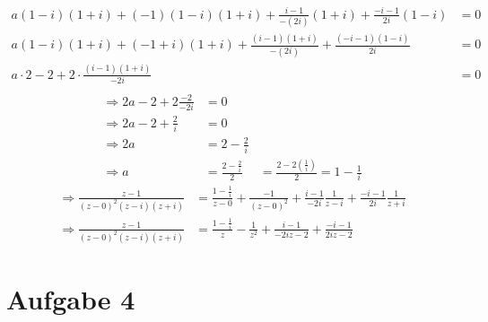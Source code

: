 \documentclass[11pt,a4paper]{article}
\begin{document}
\begin{enumerate}[a)]
\begin{align*}
        a(1-i)(1+i)+(-1)(1-i)(1+i)+\frac{i-1}{-(2i)}(1+i)+\frac{-i-1}{2i}(1-i)&=0\\
        a(1-i)(1+i)+(-1+i)(1+i)+\frac{(i-1)(1+i)}{-(2i)}+\frac{(-i-1)(1-i)}{2i}&=0\\
        a\cdot2-2+2\cdot\frac{(i-1)(1+i)}{-2i}&=0\\
    \end{align*}
    \begin{align*}
        \Rightarrow 2a-2+2\frac{-2}{-2i}&=0\\
        \Rightarrow 2a-2+\frac{2}{i}&=0\\
        \Rightarrow 2a&=2-\frac{2}{i}\\
        \Rightarrow a&=\frac{2-\frac{2}{i}}{2}&=\frac{2-2\left(\frac{1}{i}\right)}{2}=1-\frac{1}{i}
    \end{align*}
    \begin{align*}
      \Rightarrow \frac{z-1}{\left(z-0\right)^2\left(z-i\right)(z+i)}&=\frac{1-\frac{1}{i}}{z-0}+\frac{-1}{(z-0)^2}+\frac{i-1}{-2i}\frac{1}{z-i}+\frac{-i-1}{2i}\frac{1}{z+i}\\
      \Rightarrow \frac{z-1}{(z-0)^2(z-i)(z+i)}&=\frac{1-\frac{1}{i}}{z}-\frac{1}{z^2}+\frac{i-1}{-2iz-2}+\frac{-i-1}{2iz-2}
    \end{align*}
    \end{enumerate}

  \section*{Aufgabe 4}
\end{document}
